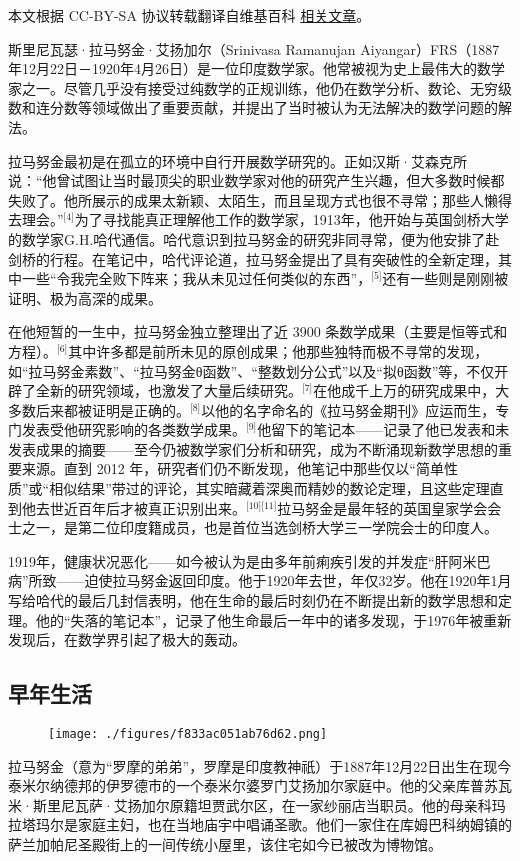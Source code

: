 
本文根据 CC-BY-SA 协议转载翻译自维基百科 \href{https://en.wikipedia.org/wiki/Srinivasa_Ramanujan}{相关文章}。

斯里尼瓦瑟·拉马努金·艾扬加尔（Srinivasa Ramanujan Aiyangar）FRS（1887年12月22日－1920年4月26日）是一位印度数学家。他常被视为史上最伟大的数学家之一。尽管几乎没有接受过纯数学的正规训练，他仍在数学分析、数论、无穷级数和连分数等领域做出了重要贡献，并提出了当时被认为无法解决的数学问题的解法。

拉马努金最初是在孤立的环境中自行开展数学研究的。正如汉斯·艾森克所说：“他曾试图让当时最顶尖的职业数学家对他的研究产生兴趣，但大多数时候都失败了。他所展示的成果太新颖、太陌生，而且呈现方式也很不寻常；那些人懒得去理会。”\(^\text{[4]}\)为了寻找能真正理解他工作的数学家，1913年，他开始与英国剑桥大学的数学家G.H.哈代通信。哈代意识到拉马努金的研究非同寻常，便为他安排了赴剑桥的行程。在笔记中，哈代评论道，拉马努金提出了具有突破性的全新定理，其中一些“令我完全败下阵来；我从未见过任何类似的东西”，\(^\text{[5]}\)还有一些则是刚刚被证明、极为高深的成果。

在他短暂的一生中，拉马努金独立整理出了近 3900 条数学成果（主要是恒等式和方程）。\(^\text{[6]}\)其中许多都是前所未见的原创成果；他那些独特而极不寻常的发现，如“拉马努金素数”、“拉马努金θ函数”、“整数划分公式”以及“拟θ函数”等，不仅开辟了全新的研究领域，也激发了大量后续研究。\(^\text{[7]}\)在他成千上万的研究成果中，大多数后来都被证明是正确的。\(^\text{[8]}\)以他的名字命名的《拉马努金期刊》应运而生，专门发表受他研究影响的各类数学成果。\(^\text{[9]}\)他留下的笔记本——记录了他已发表和未发表成果的摘要——至今仍被数学家们分析和研究，成为不断涌现新数学思想的重要来源。直到 2012 年，研究者们仍不断发现，他笔记中那些仅以“简单性质”或“相似结果”带过的评论，其实暗藏着深奥而精妙的数论定理，且这些定理直到他去世近百年后才被真正识别出来。\(^\text{[10][11]}\)拉马努金是最年轻的英国皇家学会会士之一，是第二位印度籍成员，也是首位当选剑桥大学三一学院会士的印度人。

1919年，健康状况恶化——如今被认为是由多年前痢疾引发的并发症“肝阿米巴病”所致——迫使拉马努金返回印度。他于1920年去世，年仅32岁。他在1920年1月写给哈代的最后几封信表明，他在生命的最后时刻仍在不断提出新的数学思想和定理。他的“失落的笔记本”，记录了他生命最后一年中的诸多发现，于1976年被重新发现后，在数学界引起了极大的轰动。
\subsection{早年生活}
\begin{figure}[ht]
\centering
\texttt{[image: ./figures/f833ac051ab76d62.png]}
\caption{} \label{fig_LMLJ_1}
\end{figure}
拉马努金（意为“罗摩的弟弟”，罗摩是印度教神祇）于1887年12月22日出生在现今泰米尔纳德邦的伊罗德市的一个泰米尔婆罗门艾扬加尔家庭中。他的父亲库普苏瓦米·斯里尼瓦萨·艾扬加尔原籍坦贾武尔区，在一家纱丽店当职员。他的母亲科玛拉塔玛尔是家庭主妇，也在当地庙宇中唱诵圣歌。他们一家住在库姆巴科纳姆镇的萨兰加帕尼圣殿街上的一间传统小屋里，该住宅如今已被改为博物馆。

